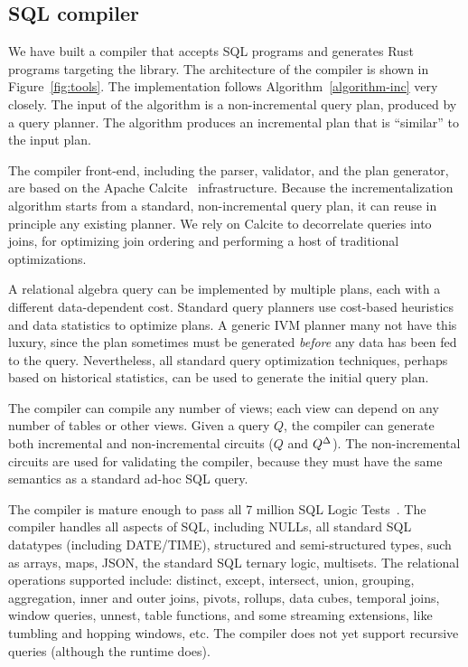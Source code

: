 \subsection{SQL compiler}

We have built a compiler that accepts SQL programs and generates Rust
programs targeting the \dbsp library.  The architecture of the
compiler is shown in Figure~\ref{fig:tools}.  The implementation
follows Algorithm~\ref{algorithm-inc} very closely.  The input of the
algorithm is a non-incremental query plan, produced by a query
planner.  The algorithm produces an incremental plan that is
``similar'' to the input plan.

The compiler front-end, including the parser, validator, and the plan
generator, are based on the Apache Calcite~\cite{begoli-icmd18}
infrastructure.  Because the incrementalization algorithm starts from
a standard, non-incremental query plan, it can reuse in principle any
existing planner.  We rely on Calcite to decorrelate queries into
joins, for optimizing join ordering and performing a host of
traditional optimizations.

A relational algebra query can be implemented by multiple plans, each
with a different data-dependent cost.  Standard query planners use
cost-based heuristics and data statistics to optimize plans.  A
generic IVM planner many not have this luxury, since the plan
sometimes must be generated \emph{before} any data has been fed to the
query.  Nevertheless, all standard query optimization techniques,
perhaps based on historical statistics, can be used to generate the
initial query plan.

The compiler can compile any number of views; each view can depend on
any number of tables or other views.  Given a query $Q$, the compiler
can generate both incremental and non-incremental circuits ($Q$ and
${Q}^{\Delta}$).  The non-incremental circuits are used for validating the
compiler, because they must have the same semantics as a standard
ad-hoc SQL query.

The compiler is mature enough to pass all 7 million SQL Logic
Tests~\cite{sqllogictest}.  The compiler handles all aspects of SQL,
including NULLs, all standard SQL datatypes (including DATE/TIME),
structured and semi-structured types, such as arrays, maps, JSON, the
standard SQL ternary logic, multisets.  The relational operations
supported include: distinct, except, intersect, union, grouping,
aggregation, inner and outer joins, pivots, rollups, data cubes,
temporal joins, window queries, unnest, table functions, and some
streaming extensions, like tumbling and hopping windows, etc.  The
compiler does not yet support recursive queries (although the runtime
does).

